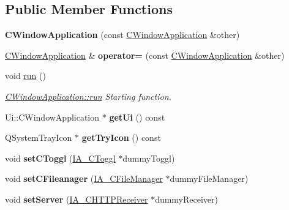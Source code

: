 \subsection*{Public Member Functions}
\begin{DoxyCompactItemize}
\item 
\mbox{\label{classCWindowApplication_a9b6283af1b61a9dca22e6eb21fe39bd5}} 
{\bfseries C\+Window\+Application} (const \hyperlink{classCWindowApplication}{C\+Window\+Application} \&other)
\item 
\mbox{\label{classCWindowApplication_aa5ecc8d05b9b1e42dbe3118fce4b1756}} 
\hyperlink{classCWindowApplication}{C\+Window\+Application} \& {\bfseries operator=} (const \hyperlink{classCWindowApplication}{C\+Window\+Application} \&other)
\item 
\mbox{\label{classCWindowApplication_ab04532bd67f44782387b89cacec59969}} 
void \hyperlink{classCWindowApplication_ab04532bd67f44782387b89cacec59969}{run} ()
\begin{DoxyCompactList}\small\item\em \hyperlink{classCWindowApplication_ab04532bd67f44782387b89cacec59969}{C\+Window\+Application\+::run} Starting function. \end{DoxyCompactList}\item 
\mbox{\label{classCWindowApplication_a9e5de0de66619077b642ea6a46d8f7dc}} 
Ui\+::\+C\+Window\+Application $\ast$ {\bfseries get\+Ui} () const
\item 
\mbox{\label{classCWindowApplication_a6c67f6fecb44ff4cce8d9a19b4068c26}} 
Q\+System\+Tray\+Icon $\ast$ {\bfseries get\+Try\+Icon} () const
\item 
\mbox{\label{classCWindowApplication_aaf94bd7b63afb4c1d2eba81f9e5dd242}} 
void {\bfseries set\+C\+Toggl} (\hyperlink{classIA__CToggl}{I\+A\+\_\+\+C\+Toggl} $\ast$dummy\+Toggl)
\item 
\mbox{\label{classCWindowApplication_a964a2e1f39920e41f77860fe97641044}} 
void {\bfseries set\+C\+Fileanager} (\hyperlink{classIA__CFileManager}{I\+A\+\_\+\+C\+File\+Manager} $\ast$dummy\+File\+Manager)
\item 
\mbox{\label{classCWindowApplication_a18b9a7d83cc85a4656a64c68930ff690}} 
void {\bfseries set\+Server} (\hyperlink{classIA__CHTTPReceiver}{I\+A\+\_\+\+C\+H\+T\+T\+P\+Receiver} $\ast$dummy\+Receiver)
\end{DoxyCompactItemize}
